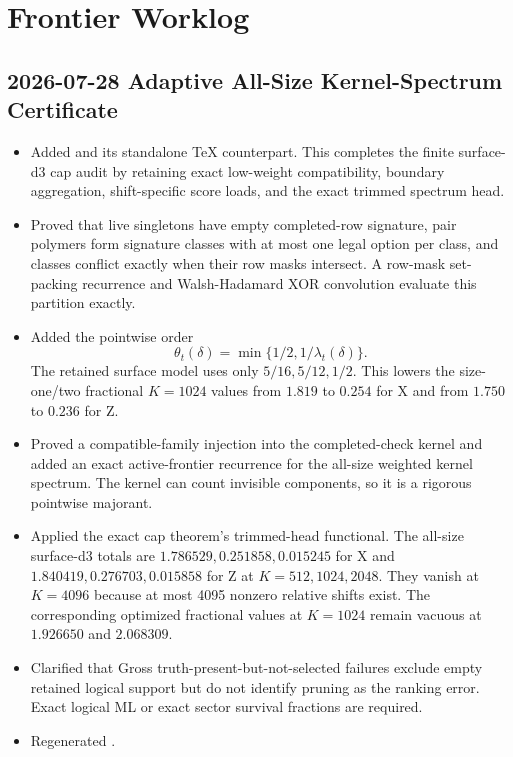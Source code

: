 \section*{Frontier Worklog}

\subsection*{2026-07-28 Adaptive All-Size Kernel-Spectrum Certificate}

\begin{itemize}
\item Added \texttt{} and its
standalone TeX counterpart.  This completes the finite surface-d3 cap audit
by retaining exact low-weight compatibility, boundary aggregation,
shift-specific score loads, and the exact trimmed spectrum head.
\item Proved that live singletons have empty completed-row signature, pair
polymers form signature classes with at most one legal option per class, and
classes conflict exactly when their row masks intersect.  A row-mask
set-packing recurrence and Walsh-Hadamard XOR convolution evaluate this
partition exactly.
\item Added the pointwise order
\[
\theta_t(\delta)=\min\{1/2,1/\lambda_t(\delta)\}.
\]
The retained surface model uses only \(5/16,5/12,1/2\).  This lowers the
size-one/two fractional \(K=1024\) values from \(1.819\) to \(0.254\) for X
and from \(1.750\) to \(0.236\) for Z.
\item Proved a compatible-family injection into the completed-check kernel
and added an exact active-frontier recurrence for the all-size weighted
kernel spectrum.  The kernel can count invisible components, so it is a
rigorous pointwise majorant.
\item Applied the exact cap theorem's trimmed-head functional.  The all-size
surface-d3 totals are \(1.786529,0.251858,0.015245\) for X and
\(1.840419,0.276703,0.015858\) for Z at \(K=512,1024,2048\).
They vanish at \(K=4096\) because at most 4095 nonzero relative shifts
exist.  The corresponding optimized fractional values at \(K=1024\) remain
vacuous at \(1.926650\) and \(2.068309\).
\item Clarified that Gross truth-present-but-not-selected failures exclude
empty retained logical support but do not identify pruning as the ranking
error.  Exact logical ML or exact sector survival fractions are required.
\item Regenerated
\texttt{}.

\end{itemize}
